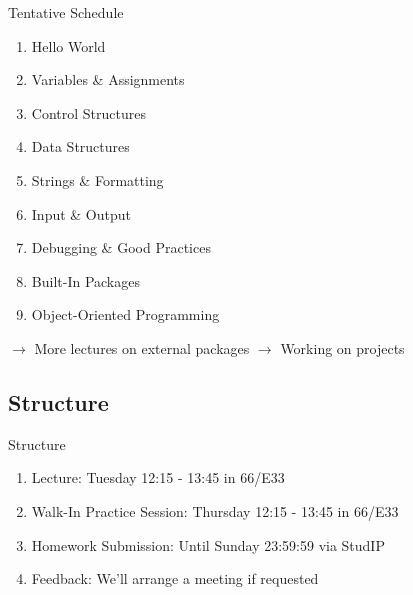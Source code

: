 \begin{frame}{Tentative Schedule}

    \begin{enumerate}
        \item Hello World
        \item Variables \& Assignments
        \item Control Structures
        \item Data Structures
        \item Strings \& Formatting
        \item Input \& Output
        \item Debugging \& Good Practices
        \item Built-In Packages
        \item Object-Oriented Programming
    \end{enumerate}
    $\rightarrow$ More lectures on external packages %
    $\rightarrow$ Working on projects

\end{frame}

\subsection{Structure}

\begin{frame}{Structure}

    \begin{enumerate}
        \item Lecture:
        \newline Tuesday 12:15 - 13:45 in 66/E33
        \item Walk-In Practice Session:
        \newline Thursday 12:15 - 13:45 in 66/E33
        \item Homework Submission:
        \newline Until Sunday 23:59:59 via StudIP
        \item Feedback:
        \newline We'll arrange a meeting if requested
    \end{enumerate}


\end{frame}

